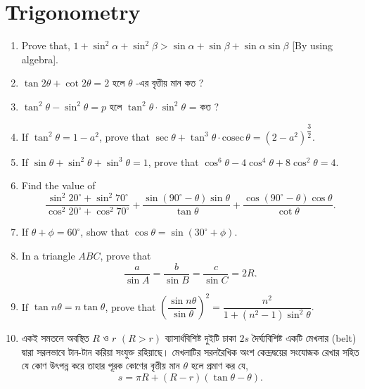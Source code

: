 \documentclass[11pt, a4paper]{article}
\begin{document}
\section{Trigonometry}

\begin{enumerate}

	\item Prove that, $ 1 + \sin^2 \alpha + \sin^2 \beta > \sin \alpha + \sin \beta + \sin \alpha \sin \beta $ [By using algebra].
	
	\item $\tan 2\theta + \cot 2\theta = 2$ \textbengali{হলে} $ \theta$ \textbengali{-এর বৃত্তীয় মান কত} ?
	
	\item $\tan^2 \theta - \sin^2 \theta = p$ \textbengali{হলে} $\tan^2 \theta \cdot \sin^2 \theta$ = \textbengali{কত} ?
	
	\item If $\tan^2 \theta = 1 - a^2$, prove that $\sec \theta + \tan^3 \theta \cdot \mathrm{cosec\,} \theta = (2 - a^2)^{\dfrac{3}{2}}$.


	\item If $\sin \theta + \sin^2 \theta + \sin^3 \theta = 1$, prove that $ \cos^6 \theta - 4\cos^4 \theta + 8 \cos^2 \theta = 4 $.
	
	\item Find the value of $$ \dfrac{\sin^2 20^{\circ} + \sin^2 70^{\circ}}{\cos^2 20^{\circ}+\cos^2 70^{\circ}} + \dfrac{\sin(90^{\circ}-\theta) \sin \theta}{\tan \theta} + \dfrac{\cos(90^{\circ}-\theta) \cos \theta}{\cot \theta} .$$
	
	\item If $ \theta + \phi = 60^{\circ} $, show that $ \cos \theta = \sin (30^{\circ} + \phi) $.
	
	\item In a triangle $ABC$, prove that $$ \dfrac{a}{\sin A} = \dfrac{b}{\sin B} = \dfrac{c}{\sin C} = 2R .$$
	
	\item If $ \tan n\theta = n \tan \theta $, prove that $ \left( \dfrac{\sin n\theta}{\sin \theta} \right)^2 = \dfrac{n^2}{1+(n^2 - 1)\sin^2 \theta} .$
	
	\item \textbengali{একই সমতলে অবস্থিত} $R$ \textbengali{ও} $r$ $(R>r)$ \textbengali{ব্যাসার্ধবিশিষ্ট দুইটি চাকা} $2s$ \textbengali{দৈর্ঘ্যবিশিষ্ট একটি মেখলার} (belt) \textbengali{দ্বারা সরলভাবে টান-টান করিয়া সংযুক্ত রহিয়াছে। মেখলাটির সরলরৈখিক অংশ কেন্দ্রদ্বয়ের সংযোজক রেখার সহিত যে কোণ উৎপন্ন করে তাহার পূরক কোণের বৃত্তীয় মান} $\theta$ \textbengali{হলে প্রমাণ কর যে,} 
	$$ s = \pi R + (R - r) (\tan \theta - \theta). $$
	

\end{enumerate}
\end{document}
